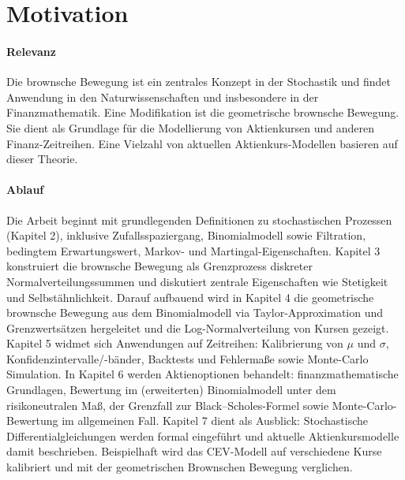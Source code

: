 \section{Motivation}

\paragraph{Relevanz}
Die brownsche Bewegung ist ein zentrales Konzept in der Stochastik und findet Anwendung in den Naturwissenschaften und insbesondere in der Finanzmathematik. Eine Modifikation ist die geometrische brownsche Bewegung. 
Sie dient als Grundlage für die Modellierung von Aktienkursen und anderen Finanz-Zeitreihen. Eine Vielzahl von
aktuellen Aktienkurs-Modellen basieren auf dieser Theorie.

\paragraph{Ablauf}
Die Arbeit beginnt mit grundlegenden Definitionen zu stochastischen Prozessen (Kapitel 2), inklusive Zufallsspaziergang, Binomialmodell sowie Filtration, 
bedingtem Erwartungswert, Markov- und Martingal-Eigenschaften. Kapitel 3 konstruiert die brownsche Bewegung 
als Grenzprozess diskreter Normalverteilungssummen und diskutiert zentrale Eigenschaften wie Stetigkeit und 
Selbstähnlichkeit. Darauf aufbauend wird in Kapitel 4 die geometrische brownsche Bewegung aus dem Binomialmodell 
via Taylor-Approximation und Grenzwertsätzen hergeleitet und die Log-Normalverteilung von Kursen gezeigt. 
Kapitel 5 widmet sich Anwendungen auf Zeitreihen: Kalibrierung von $\mu$ und $\sigma$, 
Konfidenzintervalle/-bänder, Backtests und Fehlermaße sowie Monte-Carlo Simulation. In 
Kapitel 6 werden Aktienoptionen behandelt: finanzmathematische Grundlagen, Bewertung im 
(erweiterten) Binomialmodell unter dem risikoneutralen Maß, der Grenzfall zur Black–Scholes-Formel sowie 
Monte-Carlo-Bewertung im allgemeinen Fall. Kapitel 7 dient als Ausblick: Stochastische Differentialgleichungen werden formal eingeführt und
aktuelle Aktienkursmodelle damit beschrieben. Beispielhaft wird das CEV-Modell auf verschiedene Kurse kalibriert und mit der geometrischen
Brownschen Bewegung verglichen.
